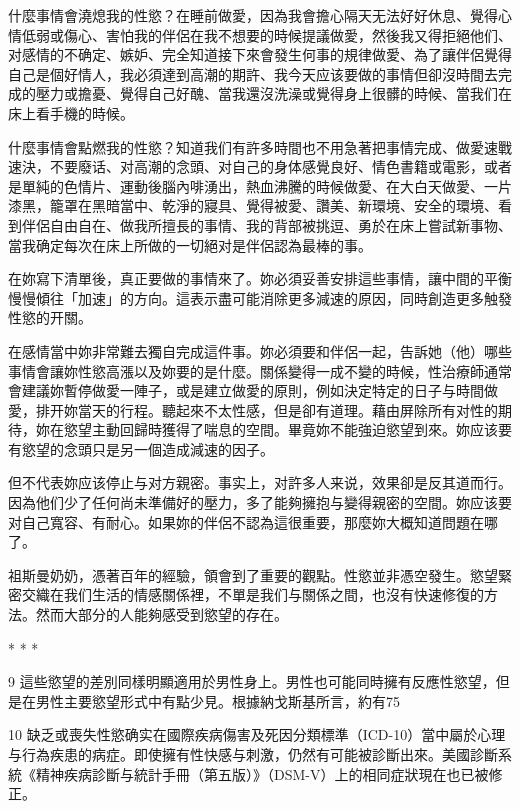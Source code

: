 \documentclass[12pt,UTF8]{ctexbook}
\begin{document}
什麼事情會澆熄我的性慾？在睡前做愛，因為我會擔心隔天无法好好休息、覺得心情低弱或傷心、害怕我的伴侶在我不想要的時候提議做愛，然後我又得拒絕他们、对感情的不确定、嫉妒、完全知道接下來會發生何事的規律做愛、為了讓伴侶覺得自己是個好情人，我必須達到高潮的期許、我今天应该要做的事情但卻沒時間去完成的壓力或擔憂、覺得自己好醜、當我還沒洗澡或覺得身上很髒的時候、當我们在床上看手機的時候。

什麼事情會點燃我的性慾？知道我们有許多時間也不用急著把事情完成、做愛速戰速決，不要廢话、对高潮的念頭、对自己的身体感覺良好、情色書籍或電影，或者是單純的色情片、運動後腦內啡湧出，熱血沸騰的時候做愛、在大白天做愛、一片漆黑，籠罩在黑暗當中、乾淨的寢具、覺得被愛、讚美、新環境、安全的環境、看到伴侶自由自在、做我所擅長的事情、我的背部被挑逗、勇於在床上嘗試新事物、當我确定每次在床上所做的一切絕对是伴侶認為最棒的事。

在妳寫下清單後，真正要做的事情來了。妳必須妥善安排這些事情，讓中間的平衡慢慢傾往「加速」的方向。這表示盡可能消除更多減速的原因，同時創造更多触發性慾的开關。

在感情當中妳非常難去獨自完成這件事。妳必須要和伴侶一起，告訴她（他）哪些事情會讓妳性慾高漲以及妳要的是什麼。關係變得一成不變的時候，性治療師通常會建議妳暫停做愛一陣子，或是建立做愛的原則，例如決定特定的日子与時間做愛，排开妳當天的行程。聽起來不太性感，但是卻有道理。藉由屏除所有对性的期待，妳在慾望主動回歸時獲得了喘息的空間。畢竟妳不能強迫慾望到來。妳应该要有慾望的念頭只是另一個造成減速的因子。

但不代表妳应该停止与对方親密。事实上，对許多人来说，效果卻是反其道而行。因為他们少了任何尚未準備好的壓力，多了能夠擁抱与變得親密的空間。妳应该要对自己寬容、有耐心。如果妳的伴侶不認為這很重要，那麼妳大概知道問題在哪了。

祖斯曼奶奶，憑著百年的經驗，領會到了重要的觀點。性慾並非憑空發生。慾望緊密交織在我们生活的情感關係裡，不單是我们与關係之間，也沒有快速修復的方法。然而大部分的人能夠感受到慾望的存在。





* * *



9	這些慾望的差別同樣明顯適用於男性身上。男性也可能同時擁有反應性慾望，但是在男性主要慾望形式中有點少見。根據納戈斯基所言，約有75%



10	缺乏或喪失性慾确实在國際疾病傷害及死因分類標準（ICD-10）當中屬於心理与行為疾患的病症。即使擁有性快感与刺激，仍然有可能被診斷出來。美國診斷系統《精神疾病診斷与統計手冊（第五版）》（DSM-V）上的相同症狀現在也已被修正。
\end{document}
